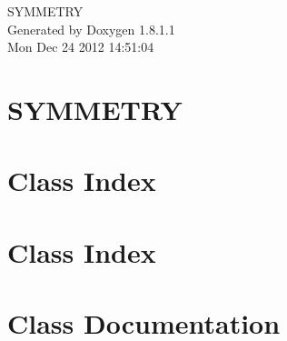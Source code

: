 \documentclass{book}
\begin{document}
\hypersetup{pageanchor=false,citecolor=blue}
\begin{titlepage}
\vspace*{7cm}
\begin{center}
{\Large S\-Y\-M\-M\-E\-T\-R\-Y }\\
\vspace*{1cm}
{\large Generated by Doxygen 1.8.1.1}\\
\vspace*{0.5cm}
{\small Mon Dec 24 2012 14:51:04}\\
\end{center}
\end{titlepage}
\clearemptydoublepage
{}
\tableofcontents
\clearemptydoublepage
{}
\hypersetup{pageanchor=true,citecolor=blue}
\chapter{S\-Y\-M\-M\-E\-T\-R\-Y}
\label{index}\hypertarget{index}{}
\chapter{Class Index}

\chapter{Class Index}

\chapter{Class Documentation}






























\printindex
\end{document}
